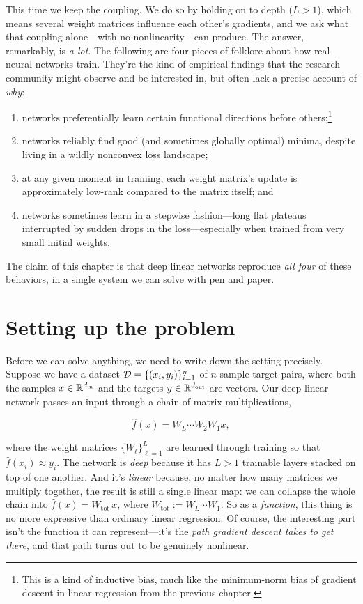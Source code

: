 This time we keep the coupling. We do so by holding on to depth ($L > 1$), which means several weight matrices influence each other's gradients, and we ask what that coupling alone---with no nonlinearity---can produce. The answer, remarkably, is \emph{a lot}. The following are four pieces of folklore about how real neural networks train. They're the kind of empirical findings that the research community might observe and be interested in, but often lack a precise account of \textit{why}:
\begin{enumerate}
    \item networks preferentially learn certain functional directions before
    others;\footnote{This is a kind of inductive bias, much like the
    minimum-norm bias of gradient descent in linear regression from the previous
    chapter.}
    \item networks reliably find good (and sometimes globally optimal) minima,
    despite living in a wildly nonconvex loss landscape;
    \item at any given moment in training, each weight matrix's update is
    approximately low-rank compared to the matrix itself; and
    \item networks sometimes learn in a stepwise fashion---long flat plateaus
    interrupted by sudden drops in the loss---especially when trained from very
    small initial weights.
\end{enumerate}

The claim of this chapter is that deep linear networks reproduce \emph{all four} of these behaviors, in a single system we can solve with pen and paper.

\section{Setting up the problem}

Before we can solve anything, we need to write down the setting precisely. Suppose we have a dataset $\mathcal{D} = \{ (x_i, y_i) \}_{i=1}^n$ of $n$ sample-target pairs, where both the samples $x \in \mathbb{R}^{d_\text{in}}$ and the targets $y \in \mathbb{R}^{d_\text{out}}$ are vectors. Our deep linear network passes an input through a chain of matrix multiplications,

\begin{equation}
    \hat{f}(x) = W_L \cdots W_2 W_1 x,
\end{equation}

where the weight matrices $\{ W_\ell\}_{\ell=1}^L$ are learned through training so that $\hat{f}(x_i) \approx y_i$. The network is \emph{deep} because it has $L > 1$ trainable layers stacked on top of one another. And it's \emph{linear} because, no matter how many matrices we multiply together, the result is still a single linear map: we can collapse the whole chain into $\hat{f}(x) = W_\text{tot}\, x$, where $W_\text{tot} := W_L \cdots W_1$. So as a \emph{function}, this thing is no more expressive than ordinary linear regression. Of course, the interesting part isn't the function it can represent---it's the \emph{path gradient descent takes to get
there}, and that path turns out to be genuinely nonlinear.


